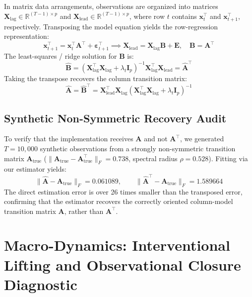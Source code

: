 \documentclass[12pt]{article}
\begin{document}
In matrix data arrangements, observations are organized into matrices $\mathbf{X}_{\text{lag}} \in \mathbb{R}^{(T-1) \times p}$ and $\mathbf{X}_{\text{lead}} \in \mathbb{R}^{(T-1) \times p}$, where row $t$ contains $\mathbf{x}_t^\top$ and $\mathbf{x}_{t+1}^\top$, respectively. Transposing the model equation yields the row-regression representation:
\begin{equation}
\mathbf{x}_{t+1}^\top = \mathbf{x}_t^\top \mathbf{A}^\top + \boldsymbol{\varepsilon}_{t+1}^\top \implies \mathbf{X}_{\text{lead}} = \mathbf{X}_{\text{lag}} \mathbf{B} + \mathbf{E}, \quad \mathbf{B} = \mathbf{A}^\top
\end{equation}
The least-squares / ridge solution for $\mathbf{B}$ is:
\begin{equation}
\hat{\mathbf{B}} = \left( \mathbf{X}_{\text{lag}}^\top \mathbf{X}_{\text{lag}} + \lambda_t \mathbf{I}_p \right)^{-1} \mathbf{X}_{\text{lag}}^\top \mathbf{X}_{\text{lead}} = \hat{\mathbf{A}}^\top
\end{equation}
Taking the transpose recovers the column transition matrix:
\begin{equation}
\hat{\mathbf{A}} = \hat{\mathbf{B}}^\top = \mathbf{X}_{\text{lead}}^\top \mathbf{X}_{\text{lag}} \left( \mathbf{X}_{\text{lag}}^\top \mathbf{X}_{\text{lag}} + \lambda_t \mathbf{I}_p \right)^{-1}
\end{equation}

\subsection{Synthetic Non-Symmetric Recovery Audit}
To verify that the implementation receives $\mathbf{A}$ and not $\mathbf{A}^\top$, we generated $T=10,000$ synthetic observations from a strongly non-symmetric transition matrix $\mathbf{A}_{\text{true}}$ ($\|\mathbf{A}_{\text{true}} - \mathbf{A}_{\text{true}}^\top\|_F = 0.738$, spectral radius $\rho = 0.528$). Fitting via our estimator yields:
\begin{equation}
\|\hat{\mathbf{A}} - \mathbf{A}_{\text{true}}\|_F = 0.061089, \qquad \|\hat{\mathbf{A}}^\top - \mathbf{A}_{\text{true}}\|_F = 1.589664
\end{equation}
The direct estimation error is over 26 times smaller than the transposed error, confirming that the estimator recovers the correctly oriented column-model transition matrix $\mathbf{A}$, rather than $\mathbf{A}^\top$.

\section{Macro-Dynamics: Interventional Lifting and Observational Closure Diagnostic}
\label{app:macro_closure}
\end{document}
